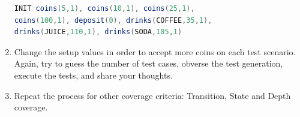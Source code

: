 \documentclass[11pt]{article}
\begin{document}
\begin{enumerate}
\begin{lstlisting}[label={lst:petri-net-setup-1},language=Java,basicstyle=\ttfamily,keywordstyle=\color{red},caption={This setup allow a maximum of four coins per test case, one per coin type (5, 10, 25, and 100). Deposit starts at 0. Each drink has it own price.}, captionpos=b]
INIT coins(5,1), coins(10,1), coins(25,1),
coins(100,1), deposit(0), drinks(COFFEE,35,1),
drinks(JUICE,110,1), drinks(SODA,105,1)
\end{lstlisting}

\item Change the setup values in order to accept more coins on each test scenario. Again, try to guess the number of test cases, obverse the test generation, execute the tests, and share your thoughts.

\item Repeat the process for other coverage criteria: Transition, State and Depth coverage.

\end{enumerate}
\end{document}

